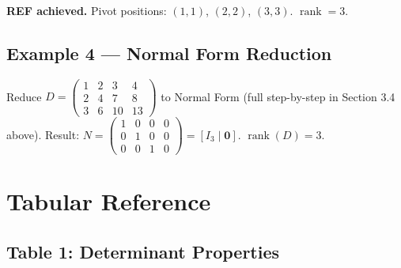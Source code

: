 \documentclass[12pt,a4paper]{article}
\begin{document}
\textbf{REF achieved.} Pivot positions: $(1,1)$, $(2,2)$, $(3,3)$. $\operatorname{rank} = 3$.

\subsection*{Example 4 --- Normal Form Reduction}

Reduce $D = \begin{pmatrix}1&2&3&4\\2&4&7&8\\3&6&10&13\end{pmatrix}$ to Normal Form (full step-by-step in Section 3.4 above).
Result: $N = \begin{pmatrix}1&0&0&0\\0&1&0&0\\0&0&1&0\end{pmatrix} = [I_3 \mid \mathbf{0}]$.
$\operatorname{rank}(D) = 3$.

\section{Tabular Reference}

\subsection*{Table 1: Determinant Properties}
\end{document}
